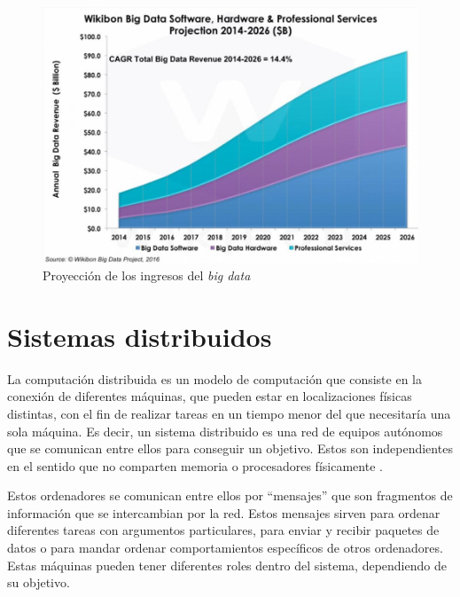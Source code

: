 \begin{figure}[htp!]
	\centering
	\caption{Proyección de los ingresos del \textit{big data}  \cite{forecast}}
	\label{forecast}
	\vspace{5pt}
	\includegraphics[scale=0.49]{graphics/forecast}
\end{figure}

\section{Sistemas distribuidos}
La computación distribuida es un modelo de computación que consiste en la conexión de diferentes máquinas, que pueden estar en localizaciones físicas distintas, con el fin de realizar tareas en un tiempo menor del que necesitaría una sola máquina. Es decir, un sistema distribuido es una red de equipos autónomos que se comunican entre ellos para conseguir un objetivo. Estos son independientes en el sentido que no comparten memoria o procesadores físicamente \cite{computacionDistribuidad}.

Estos ordenadores se comunican entre ellos por ``mensajes'' que son fragmentos de información que se intercambian por la red. Estos mensajes sirven para ordenar diferentes tareas con argumentos particulares, para enviar y recibir paquetes de datos o para mandar ordenar comportamientos específicos de otros ordenadores. Estas máquinas pueden tener diferentes roles dentro del sistema, dependiendo de su objetivo. 


